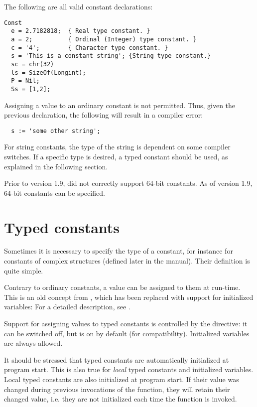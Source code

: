 The following are all valid constant declarations:
\begin{verbatim}
Const
  e = 2.7182818;  { Real type constant. }
  a = 2;          { Ordinal (Integer) type constant. }
  c = '4';        { Character type constant. }
  s = 'This is a constant string'; {String type constant.}
  sc = chr(32)
  ls = SizeOf(Longint);
  P = Nil;
  Ss = [1,2];
\end{verbatim}
Assigning a value to an ordinary constant is not permitted.
Thus, given the previous declaration, the following will result
in a compiler error:
\begin{verbatim}
  s := 'some other string';
\end{verbatim}
For string constants, the type of the string is dependent on some compiler
switches. If a specific type is desired, a typed constant should be used, 
as explained in the following section.

Prior to version 1.9, \fpc did not correctly support 64-bit constants. As
of version 1.9, 64-bit constants can be specified.

\section{Typed constants}
\label{se:typedconstants}
Sometimes it is necessary to specify the type of a constant, for instance
for constants of complex structures (defined later in the manual).
Their definition is quite simple.



Contrary to ordinary constants, a value can be assigned to them at 
run-time.  This is an old concept from \tp, which has been 
replaced with  support for initialized variables: For a detailed 
description, see .

Support for assigning values to typed constants is controlled by the 
 directive: it can be switched off, but is on by default 
(for \tp compatibility). Initialized variables are always allowed.

\begin{remark}
It should be stressed that typed constants are automatically initialized at program start.
This is also true for \emph{local} typed constants and initialized variables. 
Local typed constants are also initialized at program start. If their value was 
changed during previous invocations of the function, they will retain their 
changed value, i.e. they are not initialized each time the function is invoked.
\end{remark}

